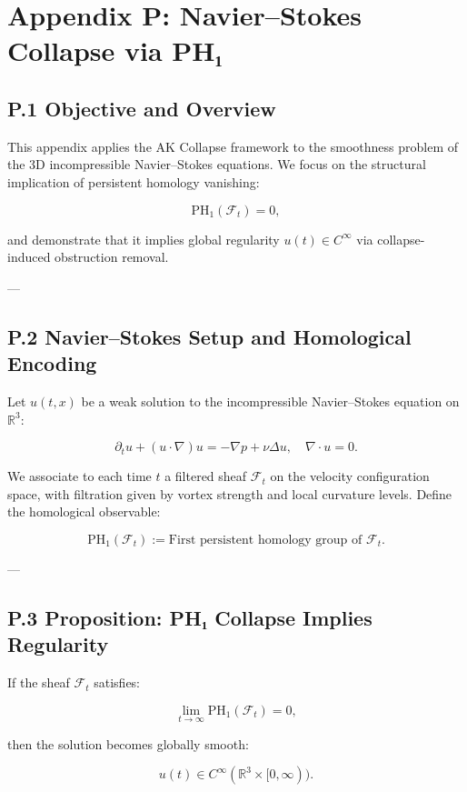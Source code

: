 \documentclass[11pt]{article}
\begin{document}

\section*{Appendix P: Navier–Stokes Collapse via PH₁}

\subsection*{P.1 Objective and Overview}

This appendix applies the AK Collapse framework to the smoothness problem of the 3D incompressible Navier–Stokes equations.  
We focus on the structural implication of persistent homology vanishing:

\[
\mathrm{PH}_1(\mathcal{F}_t) = 0,
\]

and demonstrate that it implies global regularity $u(t) \in C^\infty$ via collapse-induced obstruction removal.

---

\subsection*{P.2 Navier–Stokes Setup and Homological Encoding}

Let $u(t,x)$ be a weak solution to the incompressible Navier–Stokes equation on $\mathbb{R}^3$:

\[
\partial_t u + (u \cdot \nabla)u = -\nabla p + \nu \Delta u, \quad \nabla \cdot u = 0.
\]

We associate to each time $t$ a filtered sheaf $\mathcal{F}_t$ on the velocity configuration space, with filtration given by vortex strength and local curvature levels. Define the homological observable:

\[
\mathrm{PH}_1(\mathcal{F}_t) := \text{First persistent homology group of } \mathcal{F}_t.
\]

---

\subsection*{P.3 Proposition: PH₁ Collapse Implies Regularity}

\begin{proposition}
\label{prop:PHcollapse}
If the sheaf $\mathcal{F}_t$ satisfies:

\[
\lim_{t \to \infty} \mathrm{PH}_1(\mathcal{F}_t) = 0,
\]

then the solution becomes globally smooth:

\[
u(t) \in C^\infty(\mathbb{R}^3 \times [0, \infty)).
\]
\end{proposition}
\end{document}
